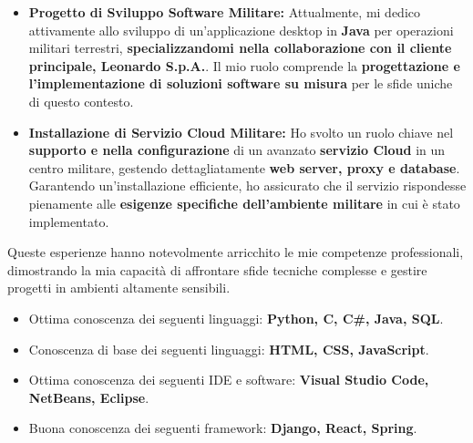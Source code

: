 \documentclass[10pt,a4paper]{altacv}
\begin{document}
\begin{itemize}
    \item \textbf{Progetto di Sviluppo Software Militare:} Attualmente, mi dedico attivamente allo sviluppo di un'applicazione desktop in \textbf{Java} per operazioni militari terrestri, \textbf{specializzandomi nella collaborazione con il cliente principale, Leonardo S.p.A.}. Il mio ruolo comprende la \textbf{progettazione e l'implementazione di soluzioni software su misura} per le sfide uniche di questo contesto.

    \item \textbf{Installazione di Servizio Cloud Militare:} Ho svolto un ruolo chiave nel \textbf{supporto e nella configurazione} di un avanzato \textbf{servizio Cloud} in un centro militare, gestendo dettagliatamente \textbf{web server, proxy e database}. Garantendo un'installazione efficiente, ho assicurato che il servizio rispondesse pienamente alle \textbf{esigenze specifiche dell'ambiente militare} in cui è stato implementato.
\end{itemize}

Queste esperienze hanno notevolmente arricchito le mie competenze professionali, dimostrando la mia capacità di affrontare sfide tecniche complesse e gestire progetti in ambienti altamente sensibili.


\begin{itemize}
    \item Ottima conoscenza dei seguenti linguaggi: \textbf{Python, C, C\#, Java, SQL}.
    \item Conoscenza di base dei seguenti linguaggi: \textbf{HTML, CSS, JavaScript}.
    \item Ottima conoscenza dei seguenti IDE e software: \textbf{Visual Studio Code, NetBeans, Eclipse}.
    \item Buona conoscenza dei seguenti framework: \textbf{Django, React, Spring}.
\end{itemize}



\end{document}
